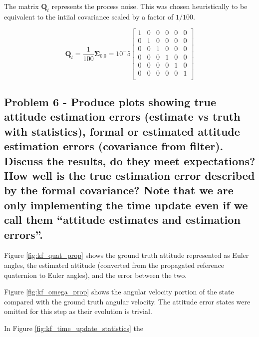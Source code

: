 The matrix $\boldsymbol{Q}_t$ represents the process noise. This was chosen heuristically to be equivalent to the intiial covariance scaled by a factor of $1/100$. 

\begin{equation*}
    \boldsymbol{Q}_t = \frac{1}{100} \boldsymbol{\Sigma}_{0 \vert 0} = 10^-5 \begin{bmatrix}
        1 & 0 & 0 & 0 & 0 & 0 \\
        0 & 1 & 0 & 0 & 0 & 0 \\
        0 & 0 & 1 & 0 & 0 & 0 \\
        0 & 0 & 0 & 1 & 0 & 0 \\
        0 & 0 & 0 & 0 & 1 & 0 \\
        0 & 0 & 0 & 0 & 0 & 1 \\
    \end{bmatrix}
\end{equation*}

\subsection{Problem 6 - Produce plots showing true attitude estimation errors (estimate vs truth with statistics), formal or estimated attitude estimation errors (covariance from filter). Discuss the results, do they meet expectations? How well is the true estimation error described by the formal covariance? Note that we are only implementing the time update even if we call them “attitude estimates and estimation errors”.}

Figure \ref{fig:kf_quat_prop} shows the ground truth attitude represented as Euler angles, the estimated attitude (converted from the propagated reference quaternion to Euler angles), and the error between the two.

Figure \ref{fig:kf_omega_prop} shows the angular velocity portion of the state compared with the ground truth angular velocity. The attitude error states were omitted for this step as their evolution is trivial.

In Figure \ref{fig:kf_time_update_statistics} the 